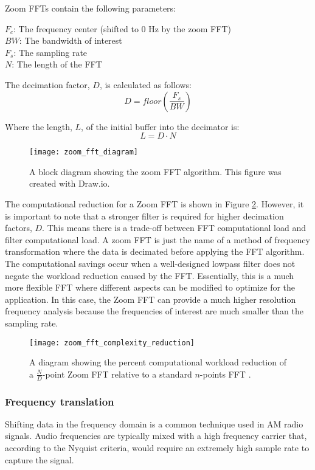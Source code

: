 Zoom FFTs \cite{zoom_fft_ref} contain the following parameters:

$F_c$: The frequency center (shifted to 0 Hz by the zoom FFT) \\
$BW$: The bandwidth of interest \\
$F_s$: The sampling rate \\
$N$: The length of the FFT

The decimation factor, $D$, is calculated as follows:
$$D = floor\left(\frac{F_s}{BW}\right)$$

Where the length, $L$, of the initial buffer into the decimator is:
$$L=D \cdot N$$

\begin{figure}
	\centering
	\texttt{[image: zoom\_fft\_diagram]}
	\decoRule
	\caption{A block diagram showing the zoom FFT algorithm. This figure was created with Draw.io.}
	\label{fig:zoom_fft_diagram}
\end{figure}

The computational reduction for a Zoom FFT is shown in Figure \ref{fig:zoom_fft_complexity_reduction}.  However, it is important to note that a stronger filter is required for higher decimation factors, $D$.  This means there is a trade-off between FFT computational load and filter computational load.  A zoom FFT is just the name of a method of frequency transformation where the data is decimated before applying the FFT algorithm.  The computational savings occur when a well-designed lowpass filter does not negate the workload reduction caused by the FFT.  Essentially, this is a much more flexible FFT where different aspects can be modified to optimize for the application.  In this case, the Zoom FFT can provide a much higher resolution frequency analysis because the frequencies of interest are much smaller than the sampling rate.


\begin{figure}
	\centering
	\texttt{[image: zoom\_fft\_complexity\_reduction]}
	\decoRule
	\caption{A diagram showing the percent computational workload reduction of a $\frac{N}{D}$-point Zoom FFT relative to a standard $n$-points FFT \cite{embedded_zoom_fft}.}
	\label{fig:zoom_fft_complexity_reduction}
\end{figure}



\subsubsection{Frequency translation}
Shifting data in the frequency domain is a common technique used in AM radio signals.  Audio frequencies are typically mixed with a high frequency carrier that, according to the Nyquist criteria, would require an extremely high sample rate to capture the signal.


